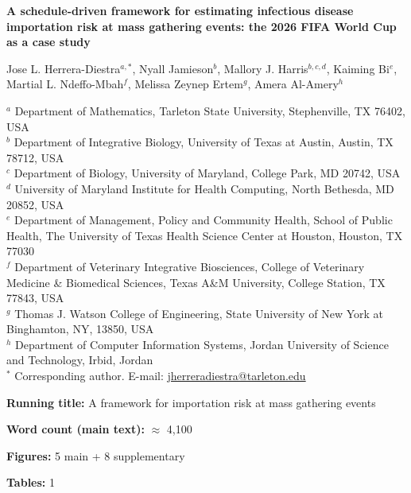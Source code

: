 \documentclass[12pt, a4paper]{article}
\begin{document}
\begin{titlepage}
\begin{center}
{\Large\bfseries A schedule-driven framework for estimating infectious
disease importation risk at mass gathering events: the 2026 FIFA World
Cup as a case study}

\vspace{1.5cm}

Jose L. Herrera-Diestra$^{a,*}$, Nyall Jamieson$^{b}$, Mallory J. Harris$^{b,c,d}$, Kaiming Bi$^{e}$, Martial L. Ndeffo-Mbah$^{f}$,  Melissa Zeynep Ertem$^{g}$, Amera Al-Amery$^{h}$

\vspace{0.5cm}

{\small
$^{a}$ Department of Mathematics, Tarleton State University, Stephenville, TX 76402, USA\\
$^{b}$ Department of Integrative Biology, University of Texas at Austin, Austin, TX 78712, USA\\
$^{c}$ Department of Biology, University of Maryland, College Park, MD 20742, USA\\
$^{d}$ University of Maryland Institute for Health Computing, North Bethesda, MD 20852, USA\\
$^{e}$ Department of Management, Policy and Community Health, School of Public Health, The University of Texas Health Science Center at Houston, Houston, TX 77030\\
$^{f}$ Department of Veterinary Integrative Biosciences, College of Veterinary Medicine \& Biomedical Sciences, Texas A\&M University, College Station, TX 77843, USA\\
$^{g}$ Thomas J. Watson College of Engineering, State University of New York at Binghamton, NY, 13850, USA\\
$^{h}$ Department of Computer Information Systems, Jordan University of Science and Technology, Irbid, Jordan\\
$^{*}$ Corresponding author.
E-mail: \href{mailto:jherreradiestra@tarleton.edu}{jherreradiestra@tarleton.edu}
}

\vspace{1cm}

\textbf{Running title:} A framework for importation risk at mass gathering events

\vspace{0.5cm}

\textbf{Word count (main text):} $\approx$ 4,100

\textbf{Figures:} 5 main + 8 supplementary

\textbf{Tables:} 1
\end{center}
\end{titlepage}
\end{document}
